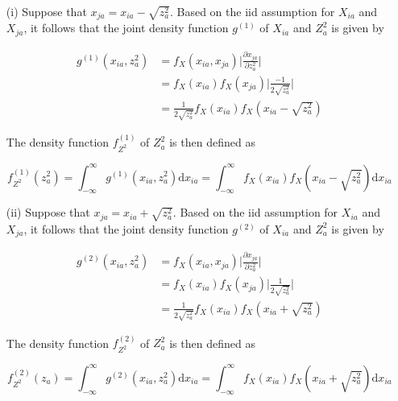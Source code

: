 \documentclass[10pt,letterpaper]{article}\usepackage[]{graphicx}\usepackage[]{color}
\begin{document}
\begin{itemize}
\item[(i)] Suppose that $x_{ja} = x_{ia} - \sqrt{z^2_a}$. Based on the iid assumption for $X_{ia}$ and $X_{ja}$, it follows that the joint density function $g^{(1)}$ of $X_{ia}$ and $Z^2_a$ is given by

\begin{equation}
\begin{aligned}
g^{(1)}(x_{ia},z^2_a) &= f_X(x_{ia},x_{ja})\biggl|\frac{\partial x_{ja}}{\partial z^2_a}\biggr| \\
&= f_X(x_{ia})f_X(x_{ja})\biggl|\frac{-1}{2\sqrt{z^2_a}}\biggr| \\
&= \frac{1}{2\sqrt{z^2_a}}f_X(x_{ia})f_X(x_{ia}-\sqrt{z^2_a})
\end{aligned}
\end{equation}

The density function $f^{(1)}_{Z^2}$ of $Z^2_a$ is then defined as

\begin{equation}
f^{(1)}_{Z^2}(z^2_a) = \int_{-\infty}^{\infty} g^{(1)}(x_{ia},z^2_a)\text{d}x_{ia} = \int_{-\infty}^{\infty} f_X(x_{ia})f_X(x_{ia}-\sqrt{z^2_a})\text{d}x_{ia}
\end{equation}

\item[(ii)] Suppose that $x_{ja} = x_{ia} + \sqrt{z^2_a}$. Based on the iid assumption for $X_{ia}$ and $X_{ja}$, it follows that the joint density function $g^{(2)}$ of $X_{ia}$ and $Z^2_a$ is given by

\begin{equation}
\begin{aligned}
g^{(2)}(x_{ia},z^2_a) &= f_X(x_{ia},x_{ja})\biggl|\frac{\partial x_{ja}}{\partial z^2_a}\biggr| \\
&= f_X(x_{ia})f_X(x_{ja})\biggl|\frac{1}{2\sqrt{z^2_a}}\biggr| \\
&= \frac{1}{2\sqrt{z^2_a}}f_X(x_{ia})f_X(x_{ia}+\sqrt{z^2_a})
\end{aligned}
\end{equation}

The density function $f^{(2)}_{Z^2}$ of $Z^2_a$ is then defined as

\begin{equation}
f^{(2)}_{Z^2}(z_a) = \int_{-\infty}^{\infty} g^{(2)}(x_{ia},z^2_a)\text{d}x_{ia} = \int_{-\infty}^{\infty} f_X(x_{ia})f_X(x_{ia}+\sqrt{z^2_a})\text{d}x_{ia}
\end{equation}
\end{itemize}
\end{document}
